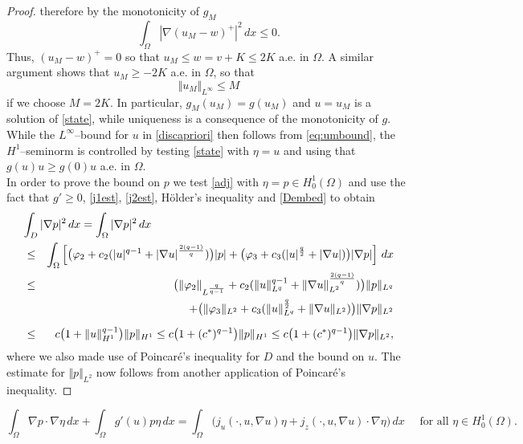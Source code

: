 \documentclass[10pt,a4paper]{amsart}
\newcommand{\dx}{\,dx}
\begin{document}
\begin{proof}
therefore by the monotonicity of $g_M$
\begin{displaymath}
    \int_\Omega | \nabla(u_M-w)^+ |^2 \dx \leq 0.
\end{displaymath}
Thus, $(u_M - w)^+=0$ so that $u_M \leq w =v+K \leq 2K$ a.e. in $\Omega$. A similar argument
shows that $u_M \geq -2K$ a.e. in $\Omega$, so that 
\begin{equation} \label{eq:umbound}
\Vert  u_M \Vert_{L^\infty}  \leq M
\end{equation}
if we choose $M=2K$. In particular, $g_M(u_M)=g(u_M)$ and $u=u_M$ is a solution of
\eqref{state}, while uniqueness is a consequence of the monotonicity of $g$. While the $L^\infty$--bound for $u$ in \eqref{discapriori} then follows from \eqref{eq:umbound}, the $H^1$--seminorm is controlled
by testing \eqref{state} with $\eta=u$ and using that $g(u)u
\geq g(0)u$ a.e. in $\Omega$. \\
In order to prove the bound on $p$ we test \eqref{adj} with $\eta=p \in H^1_0(\Omega)$ and use 
the fact that $g' \geq 0$, \eqref{j1est}, \eqref{j2est},
H\"older's inequality and  {\eqref{Dembed}} to obtain
\begin{eqnarray*}
\lefteqn{  \int_D | \nabla p |^2  \dx = 
\int_{\Omega} | \nabla p |^2  \dx    } \\
 & \leq & \int_{\Omega} \left[ \bigl( \varphi_2 + c_2( | u |^{q-1} + | \nabla u |^{\frac{2(q-1)}{q}} ) \bigr) | p | + \bigl( \varphi_3 + c_3( | u|^{\frac{q}{2}} + | \nabla u | ) \bigr)  | \nabla p | 
 \right] \dx \\
& \leq & \bigl( \Vert \varphi_2 \Vert_{L^{\frac{q}{q-1}}} + c_2(\Vert u \Vert_{L^q}^{q-1} + \Vert \nabla u \Vert_{L^2}^{\frac{2(q-1)}{q}} ) \bigr)  \Vert p \Vert_{L^q}   \\
& & + \bigl( \Vert \varphi_3 \Vert_{L^2} + c_3( \Vert u \Vert_{L^q}^{\frac{q}{2}} + \Vert \nabla u \Vert_{L^2})  \bigr) \Vert  \nabla p \Vert_{L^2} \\[2mm]
& \leq & c \bigl( 1+ \Vert u \Vert_{H^1}^{q-1}  \bigr)   \Vert p \Vert_{H^1} \leq c \bigl( 1 + (c^*)^{q-1} \bigr) \Vert p \Vert_{H^1} \leq c \bigl( 1 + (c^*)^{q-1} \bigr) \Vert \nabla p \Vert_{L^2},
\end{eqnarray*}
{where we also made use of Poincar\'e's inequality for $D$ and the bound on $u$.} The estimate for 
$\Vert p \Vert_{L^2}$ now follows from another application  of Poincar\'e's inequality.
\end{proof}
\noindent

\begin{equation} 
\int_{\Omega} \nabla p \cdot \nabla \eta  \dx + \int_{\Omega} g'(u) p \eta \dx = \int_{\Omega} \bigl( j_u(\cdot,u,\nabla u) \eta + j_z(\cdot,u,\nabla u) \cdot \nabla \eta \bigr)  \dx \quad \mbox{ for all } \eta \in H^1_0(\Omega).
\end{equation}
\end{document}
